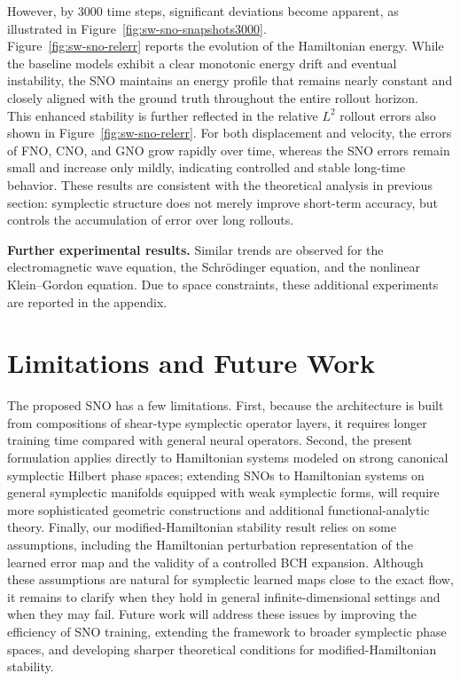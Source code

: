 \documentclass{article}
\theoremstyle{plain}
\theoremstyle{definition}
\theoremstyle{remark}
\begin{document}
However, by 3000 time steps, significant deviations become apparent, 
as illustrated in Figure~\ref{fig:sw-sno-snapshots3000}.\\
Figure~\ref{fig:sw-sno-relerr} reports the evolution of the Hamiltonian energy. 
While the baseline models exhibit a clear monotonic energy drift and eventual instability, 
the SNO maintains an energy profile that remains nearly constant and closely aligned with 
the ground truth throughout the entire rollout horizon.\\
This enhanced stability is further reflected in the relative $L^2$ rollout errors also 
shown in Figure~\ref{fig:sw-sno-relerr}. For both displacement and velocity, 
the errors of FNO, CNO, and GNO grow rapidly over time, whereas the SNO errors 
remain small and increase only mildly, indicating controlled and stable long-time behavior.
These results are consistent with the theoretical
analysis in previous section: symplectic structure does
not merely improve short-term accuracy, but controls the accumulation of error
over long rollouts.

\textbf{Further experimental results.}
Similar trends are observed for the electromagnetic wave equation, the
Schr\"odinger equation, and the nonlinear Klein--Gordon equation. Due to space
constraints, these additional experiments are reported in the appendix.
\section{Limitations and Future Work}
\label{sec:limitations}
The proposed SNO has a few limitations. First, because the architecture is built from compositions of shear-type symplectic operator layers, it requires longer  training time compared with general neural operators. Second, the present formulation applies directly to Hamiltonian systems modeled on strong canonical symplectic Hilbert phase spaces; extending SNOs to Hamiltonian systems on general symplectic manifolds equipped with weak symplectic forms, will require more sophisticated geometric constructions and additional functional-analytic theory. Finally, our modified-Hamiltonian stability result relies on some assumptions, including the Hamiltonian perturbation representation of the learned error map and the validity of a controlled BCH expansion. Although these assumptions are natural for symplectic learned maps close to the exact flow, it remains to clarify when they hold in general infinite-dimensional settings and when they may fail. Future work will address these issues by improving the efficiency of SNO training, extending the framework to broader symplectic phase spaces, and developing sharper theoretical conditions for modified-Hamiltonian stability.
\end{document}
